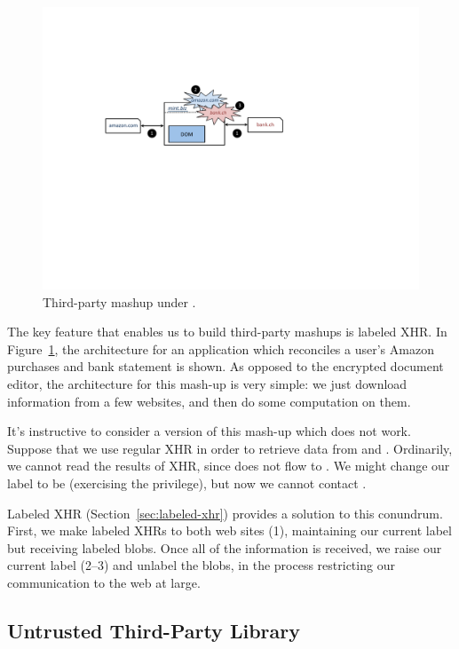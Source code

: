 \begin{figure}
\centerline{\includegraphics[width=\columnwidth]{mashup}}
\caption{\label{fig:mashup} Third-party mashup under \sys{}.}
\end{figure}
The key feature that enables us to build third-party mashups is
labeled XHR\@.  In Figure~\ref{fig:mashup}, the architecture for an
application which reconciles a user's Amazon purchases
and bank statement is shown.  As opposed to the encrypted document editor,
the architecture for this mash-up is very simple: we just download
information from a few websites, and then do some computation on them.

It's instructive to consider a version of this mash-up which does not
work.  Suppose that we use regular XHR in order to retrieve data from
 and .  Ordinarily, we cannot read
the results of XHR, since  does not flow to .
We might change our label to be  (exercising the 
privilege), but now we cannot contact .

Labeled XHR (Section~\ref{sec:labeled-xhr}) provides a solution to
this conundrum.  First, we make labeled XHRs to both web sites (1),
maintaining our current label but receiving labeled blobs.  Once all of
the information is received, we raise our current label (2--3) and
unlabel the blobs, in the process restricting our communication to the
web at large.

\subsection{Untrusted Third-Party Library}
\label{sec:apps-third-party}

